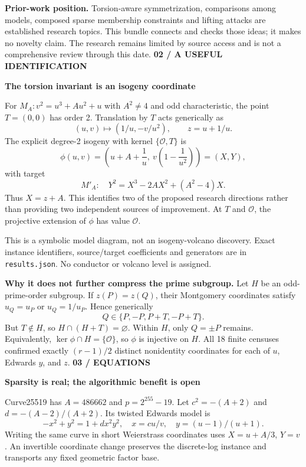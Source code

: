 \documentclass[11pt]{article}
\newcommand{\titleline}[2]{{\small\color{teal}\textbf{#1}}\par{\LARGE\color{ink}\textbf{#2}}\par\vspace{3mm}}
\begin{document}
\textbf{Prior-work position.} Torsion-aware symmetrization, comparisons among models, composed sparse membership constraints and lifting attacks are established research topics. This bundle connects and checks those ideas; it makes no novelty claim. The research remains limited by source access and is not a comprehensive review through this date.
\newpage
\titleline{02 / A USEFUL IDENTIFICATION}{The torsion invariant is an isogeny coordinate}
For $M_A:v^2=u^3+Au^2+u$ with $A^2\ne4$ and odd characteristic, the point $T=(0,0)$ has order 2. Translation by $T$ acts generically as
\[
 (u,v)\longmapsto(1/u,-v/u^2),\qquad z=u+1/u.
\]
The explicit degree-2 isogeny with kernel $\{\mathcal O,T\}$ is
\[
 \phi(u,v)=\left(u+A+\frac1u,\ v\left(1-\frac1{u^2}\right)\right)=(X,Y),
\]
with target
\[
 M'_A:\quad Y^2=X^3-2AX^2+(A^2-4)X.
\]
Thus $X=z+A$. This identifies two of the proposed research directions rather than providing two independent sources of improvement. At $T$ and $\mathcal O$, the projective extension of $\phi$ has value $\mathcal O$.

\begin{center}\end{center}
This is a symbolic model diagram, not an isogeny-volcano discovery. Exact instance identifiers, source/target coefficients and generators are in \texttt{results.json}. No conductor or volcano level is assigned.

\textbf{Why it does not further compress the prime subgroup.} Let $H$ be an odd-prime-order subgroup. If $z(P)=z(Q)$, their Montgomery coordinates satisfy $u_Q=u_P$ or $u_Q=1/u_P$. Hence generically
\[
 Q\in\{P,-P,P+T,-P+T\}.
\]
But $T\notin H$, so $H\cap(H+T)=\varnothing$. Within $H$, only $Q=\pm P$ remains. Equivalently, $\ker\phi\cap H=\{\mathcal O\}$, so $\phi$ is injective on $H$. All 18 finite censuses confirmed exactly $(r-1)/2$ distinct nonidentity coordinates for each of $u$, Edwards $y$, and $z$.
\newpage
\titleline{03 / EQUATIONS}{Sparsity is real; the algorithmic benefit is open}
Curve25519 has $A=486662$ and $p=2^{255}-19$. Let $c^2=-(A+2)$ and $d=-(A-2)/(A+2)$. Its twisted Edwards model is
\[
 -x^2+y^2=1+dx^2y^2,\quad x=cu/v,\quad y=(u-1)/(u+1).
\]
Writing the same curve in short Weierstrass coordinates uses $X=u+A/3$, $Y=v$. An invertible coordinate change preserves the discrete-log instance and transports any fixed geometric factor base.
\end{document}

